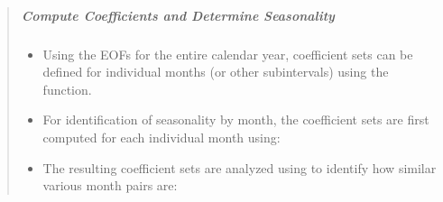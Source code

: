 \documentclass[letterpaper,10pt,english]{sphinxmanual}
\begin{document}
\begin{itemize}
\begin{quote}
\subparagraph{Compute Coefficients and Determine Seasonality}
\label{\detokenize{eofs:compute-coefficients-and-determine-seasonality}}\begin{itemize}
\item {} 
Using the EOFs for the entire calendar year, coefficient sets can be defined for individual months (or other sub\sphinxhyphen{}intervals) using the  function.

\item {} 
For identification of seasonality by month, the coefficient sets are first computed for each individual month using:

\end{itemize}

\begin{sphinxVerbatim}[commandchars=\\\{\}]
  \PYG{p}{[}\PYG{p}{]}  
    
        
    \PYG{p}{[}  \PYG{p}{]}      
\end{sphinxVerbatim}
\begin{itemize}
\item {} 
The resulting coefficient sets are analyzed using  to identify how similar various month pairs are:

\end{itemize}


\end{quote}
\end{itemize}
\end{document}
